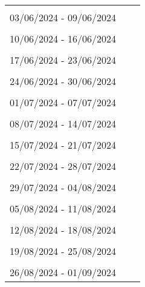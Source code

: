 \begin{table} [htb]
\centering
\begin{tabular}{p{10cm}c r} \\
\hline \\ 
 03/06/2024 - 09/06/2024\\ 
\hline \\ 
 10/06/2024 - 16/06/2024\\ 
\hline \\ 
 17/06/2024 - 23/06/2024\\ 
\hline \\ 
 24/06/2024 - 30/06/2024\\ 
\hline \\ 
 01/07/2024 - 07/07/2024\\ 
\hline \\ 
 08/07/2024 - 14/07/2024\\ 
\hline \\ 
 15/07/2024 - 21/07/2024\\ 
\hline \\ 
 22/07/2024 - 28/07/2024\\ 
\hline \\ 
 29/07/2024 - 04/08/2024\\ 
\hline \\ 
 05/08/2024 - 11/08/2024\\ 
\hline \\ 
 12/08/2024 - 18/08/2024\\ 
\hline \\ 
 19/08/2024 - 25/08/2024\\ 
\hline \\ 
 26/08/2024 - 01/09/2024\\ 

\end{tabular}
\end{table}
